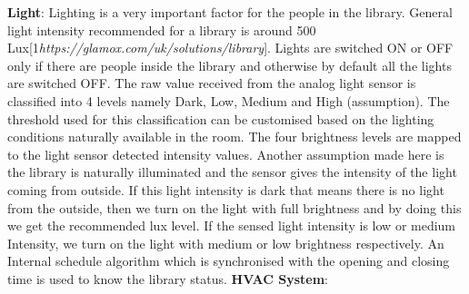 \documentclass[runningheads]{llncs}
\begin{document}
\vspace{2mm}
\newline\textbf{Light}:
Lighting is a very important factor for the people in the library. General light intensity recommended for a library is around 500 Lux[1\textit{https://glamox.com\newline/uk/solutions/library}]. Lights are switched ON or OFF only if there are people inside the library and otherwise by default all the lights are switched OFF. The raw value received from the analog light sensor is classified into 4 levels namely Dark, Low, Medium and High (assumption). The threshold used for this classification can be customised based on the lighting conditions naturally available in the room. The four brightness levels are mapped to the light sensor detected intensity values. Another assumption made here is the library is naturally illuminated and the sensor gives the intensity of the light coming from outside. If this light intensity is dark that means there is no light from the outside, then we turn on the light with full brightness and by doing this we get the recommended lux level. If the sensed light intensity is low or medium Intensity, we turn on the light with medium or low brightness respectively. An Internal schedule algorithm which is synchronised with the opening and closing time is used to know the library status.
\vspace{3mm}
\newline\textbf{HVAC System}:
\end{document}
